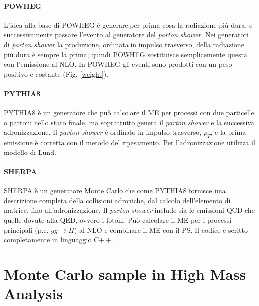 \paragraph{P{\footnotesize OWHEG}} L'idea alla  base di   P{\footnotesize OWHEG} \cite{Oleari:2010nx} è generare per prima cosa la radiazione più dura, e successivamente  passare l'evento al generatore del \textit{parton shower}. Nei generatori di \textit{parton shower} la produzione, ordinata in impulso trasverso, della radiazione più dura è sempre la prima; quindi  P{\footnotesize OWHEG} sostituisce semplicemente questa con l'emissione al NLO. 
In   P{\footnotesize OWHEG} gli eventi sono prodotti con un peso positivo e costante (Fig. \ref{weight}).
 
 
\paragraph{P{\footnotesize YTHIA}8 }  P{\footnotesize YTHIA}8 \cite{bib:pythia} è un generatore che può calcolare il ME per processi con due particelle o partoni nello stato finale, ma soprattutto genera il \textit{parton shower} e la successiva adronizzazione. Il \textit{parton shower} è ordinato in impulso trasverso, $p_T$, e la prima emissione è corretta con il metodo del ripesamento. Per l’adronizzazione utilizza il modello di Lund.  
 
 
\paragraph{S{\footnotesize HERPA}}  S{\footnotesize HERPA}  \cite{bib:sherpa} è un generatore Monte Carlo che come PYTHIA8  fornisce una descrizione completa della collisioni adroniche, dal calcolo dell’elemento di matrice, fino all’adronizzazione.  Il \textit{parton shower} include sia le emissioni QCD che quelle dovute alla QED, ovvero i fotoni. Può calcolare il ME per i processi principali (p.e. $gg \rightarrow H$) al NLO e combinare il ME con il  PS. Il codice è scritto completamente in linguaggio C$++$.  



\section{Monte Carlo sample in High Mass Analysis}

